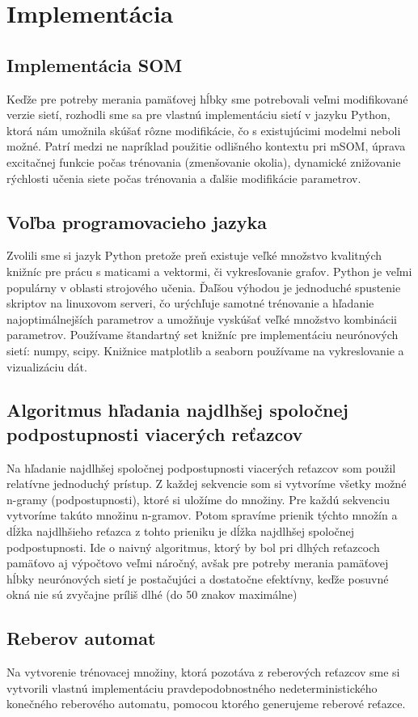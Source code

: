 \chapter{Implementácia}


\section{Implementácia SOM}
Keďže pre potreby merania pamäťovej hĺbky sme potrebovali 
veľmi modifikované verzie sietí, rozhodli sme sa pre vlastnú implementáciu sietí
v jazyku Python, ktorá nám umožnila skúšať rôzne modifikácie, čo 
s existujúcimi modelmi neboli možné. Patrí medzi ne napríklad použitie odlišného kontextu pri mSOM, 
úprava excitačnej funkcie počas trénovania (zmenšovanie okolia), dynamické znižovanie rýchlosti
učenia siete počas trénovania a ďalšie modifikácie parametrov.

\section{Voľba programovacieho jazyka}
Zvolili sme si jazyk Python pretože preň existuje veľké množstvo kvalitných knižníc pre prácu
s maticami a vektormi, či vykresľovanie grafov.
Python je veľmi populárny v oblasti strojového učenia. Ďaľšou výhodou je jednoduché spustenie skriptov
na linuxovom serveri, čo urýchľuje samotné trénovanie a hľadanie najoptimálnejších parametrov a umožňuje vyskúšať 
veľké množstvo kombinácii parametrov.
Používame štandartný set knižníc pre implementáciu neurónových sietí: numpy, scipy.
Knižnice matplotlib a seaborn používame na vykreslovanie a vizualizáciu dát.

\section{Algoritmus hľadania najdlhšej spoločnej podpostupnosti viacerých reťazcov}
Na hľadanie najdlhšej spoločnej podpostupnosti viacerých reťazcov som použil relatívne jednoduchý prístup. 
Z každej sekvencie som si vytvoríme všetky možné n-gramy (podpostupnosti), ktoré si uložíme do množiny.
Pre každú sekvenciu vytvoríme takúto množinu n-gramov. Potom spravíme prienik týchto množín a dĺžka najdlhšieho 
reťazca z tohto prieniku je dĺžka najdlhšej spoločnej podpostupnosti. Ide o naivný algoritmus, ktorý by bol pri
dlhých reťazcoch pamäťovo aj výpočtovo veľmi náročný, avšak pre potreby merania pamäťovej hĺbky neurónových sietí
je postačujúci a dostatočne efektívny, keďže posuvné okná nie sú zvyčajne príliš dlhé (do 50 znakov maximálne)

\section{Reberov automat}
Na vytvorenie trénovacej množiny, ktorá pozotáva z reberových reťazcov sme si vytvorili vlastnú implementáciu pravdepodobnostného nedeterministického
konečného reberového automatu, pomocou ktorého generujeme reberové reťazce.